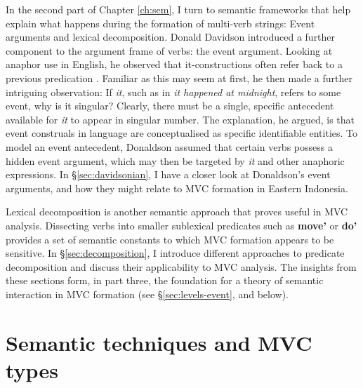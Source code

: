 In the second part of Chapter \ref{ch:sem}, I turn to semantic frameworks that help explain what happens during the formation of multi-verb strings: Event arguments and lexical decomposition. Donald Davidson introduced a further component to the argument frame of verbs: the event argument. Looking at anaphor use in English, he observed that it-constructions often refer back to a previous predication \citep{davidson1967logical}. Familiar as this may seem at first, he then made a further intriguing observation: If \textit{it}, such as in \textit{it happened at midnight}, refers to some event, why is it singular? Clearly, there must be a single, specific antecedent available for \textit{it} to appear in singular number. The explanation, he argued, is that event construals in language are conceptualised as specific identifiable entities. To model an event antecedent, Donaldson assumed that certain verbs possess a hidden event argument, which may then be targeted by \textit{it} and other anaphoric expressions. In §\ref{sec:davidsonian}, I have a closer look at Donaldson's event arguments, and how they might relate to MVC formation in Eastern Indonesia. 

Lexical decomposition is another semantic approach that proves useful in MVC analysis. Dissecting verbs into smaller sublexical predicates such as \textbf{move'} or \textbf{do'} provides a set of semantic constants to which MVC formation appears to be sensitive. In §\ref{sec:decomposition}, I introduce different approaches to predicate decomposition and discuss their applicability to MVC analysis. The insights from these sections form, in part three, the foundation for a theory of semantic interaction in MVC formation (see §\ref{sec:levels-event}, and below).

\section*{Semantic techniques and MVC types}

